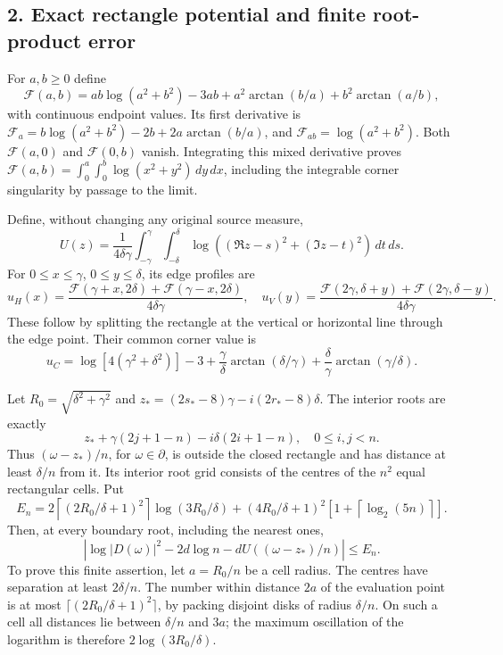 \documentclass[11pt]{article}
\begin{document}
\subsection{2. Exact rectangle potential and finite root-product error}\label{exact-rectangle-potential-and-finite-root-product-error}

For \(a,b\ge0\) define \[
\mathscr F(a,b)=ab\log(a^2+b^2)-3ab+a^2\arctan(b/a)+b^2\arctan(a/b),
\tag{FW11}
\] with continuous endpoint values. Its first derivative is \(\mathscr F_a=b\log(a^2+b^2)-2b+2a\arctan(b/a)\), and \(\mathscr F_{ab}=\log(a^2+b^2)\). Both \(\mathscr F(a,0)\) and \(\mathscr F(0,b)\) vanish. Integrating this mixed derivative proves \(\mathscr F(a,b)=\int_0^a\int_0^b\log(x^2+y^2)\,dy\,dx\), including the integrable corner singularity by passage to the limit.

Define, without changing any original source measure, \[
U(z)=\frac1{4\delta\gamma}\int_{-\gamma}^{\gamma}\int_{-\delta}^{\delta}
\log((\Re z-s)^2+(\Im z-t)^2)\,dt\,ds.
\] For \(0\le x\le\gamma\), \(0\le y\le\delta\), its edge profiles are \[
u_H(x)=\frac{\mathscr F(\gamma+x,2\delta)+\mathscr F(\gamma-x,2\delta)}{4\delta\gamma},\quad
u_V(y)=\frac{\mathscr F(2\gamma,\delta+y)+\mathscr F(2\gamma,\delta-y)}{4\delta\gamma}.
\tag{FW12}
\] These follow by splitting the rectangle at the vertical or horizontal line through the edge point. Their common corner value is \[
u_C=\log[4(\gamma^2+\delta^2)]-3+
\frac\gamma\delta\arctan(\delta/\gamma)+\frac\delta\gamma\arctan(\gamma/\delta).
\tag{FW13}
\]

Let \(R_0=\sqrt{\delta^2+\gamma^2}\) and \(z_*=(2s_*-8)\gamma-i(2r_*-8)\delta\). The interior roots are exactly \[
z_*+\gamma(2j+1-n)-i\delta(2i+1-n),\quad 0\le i,j<n.
\] Thus \((\omega-z_*)/n\), for \(\omega\in\partial\), is outside the closed rectangle and has distance at least \(\delta/n\) from it. Its interior root grid consists of the centres of the \(n^2\) equal rectangular cells. Put \[
E_n=2\left\lceil(2R_0/\delta+1)^2\right\rceil\log(3R_0/\delta)
+(4R_0/\delta+1)^2\left[1+\left\lceil\log_2(5n)\right\rceil\right].
\tag{FW14}
\] Then, at every boundary root, including the nearest ones, \[
\left|\log|D(\omega)|^2-2d\log n-dU((\omega-z_*)/n)\right|\le E_n.
\tag{FW15}
\] To prove this finite assertion, let \(a=R_0/n\) be a cell radius. The centres have separation at least \(2\delta/n\). The number within distance \(2a\) of the evaluation point is at most \(\lceil(2R_0/\delta+1)^2\rceil\), by packing disjoint disks of radius \(\delta/n\). On such a cell all distances lie between \(\delta/n\) and \(3a\); the maximum oscillation of the logarithm is therefore \(2\log(3R_0/\delta)\).
\end{document}

